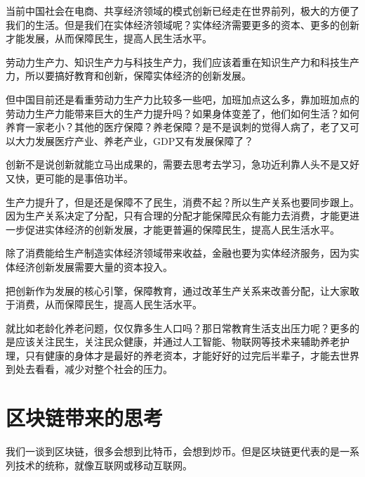 \documentclass[UTF9]{ctexart}
\begin{document}
当前中国社会在电商、共享经济领域的模式创新已经走在世界前列，极大的方便了我们的生活。但是我们在实体经济领域呢？实体经济需要更多的资本、更多的创新才能发展，从而保障民生，提高人民生活水平。

\begin{quote}
\end{quote}


劳动力生产力、知识生产力与科技生产力，我们应该着重在知识生产力和科技生产力，所以要搞好教育和创新，保障实体经济的创新发展。

但中国目前还是看重劳动力生产力比较多一些吧，加班加点这么多，靠加班加点的劳动力生产力能带来巨大的生产力提升吗？如果身体变差了，他们如何生活？如何养育一家老小？其他的医疗保障？养老保障？是不是讽刺的觉得人病了，老了又可以大力发展医疗产业、养老产业，GDP又有发展保障了？

创新不是说创新就能立马出成果的，需要去思考去学习，急功近利靠人头不是又好又快，更可能的是事倍功半。


生产力提升了，但是还是保障不了民生，消费不起？所以生产关系也要同步跟上。因为生产关系决定了分配，只有合理的分配才能保障民众有能力去消费，才能更进一步促进实体经济的创新发展，才能更普遍的保障民生，提高人民生活水平。

除了消费能给生产制造实体经济领域带来收益，金融也要为实体经济服务，因为实体经济创新发展需要大量的资本投入。

把创新作为发展的核心引擎，保障教育，通过改革生产关系来改善分配，让大家敢于消费，从而保障民生，提高人民生活水平。


就比如老龄化养老问题，仅仅靠多生人口吗？那日常教育生活支出压力呢？更多的是应该关注民生，关注民众健康，并通过人工智能、物联网等技术来辅助养老护理，只有健康的身体才是最好的养老资本，才能好好的过完后半辈子，才能去世界到处去看看，减少对整个社会的压力。

\section{区块链带来的思考}

我们一谈到区块链，很多会想到比特币，会想到炒币。但是区块链更代表的是一系列技术的统称，就像互联网或移动互联网。
\end{document}
